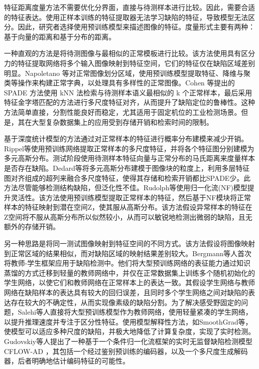 特征距离度量方法不需要优化分界面，直接与待测样本进行比较。因此，需要合适的特征表达。使用正样本训练的特征提取器无法学习缺陷的特征，导致模型无法区分。因此，研究者选择使用预训练模型来描述图像的特征。度量形式主要有两种：基于向量的距离和基于分布的距离。

一种直观的方法是将待测图像与最相似的正常模板进行比较。该方法使用具有区分力的特征提取网络将多个输入图像映射到特征空间，它们的特征仅在缺陷区域差别明显。Napoletano 等\cite{napoletanoAnomalyDetectionNanofibrous2018}对正常图像划分区域，使用预训练模型提取特征、降维与聚类等操作来构建正常字典，以处理具有多样性的正常图像。Cohen 等\cite{cohenSubImageAnomalyDetection2021}提出的 SPADE 方法使用 kNN 法检索与待测样本语义最相似的 k 个正常样本，最后采用特征金字塔匹配的方法进行多尺度特征对齐，从而提升了缺陷定位的鲁棒性。这种方法简单直接，分割性能良好而稳定，尤其适用于固定机位的工业检测场景。但是，其在大型复杂数据集上的应用受到存储开销和检索时间的限制。

基于深度统计模型的方法通过对正常样本的特征进行概率分布建模来减少开销。Rippel等\cite{rippelModelingDistributionNormal2021}使用预训练网络提取正常样本的多尺度特征，并将各个特征图分别建模为多元高斯分布。测试阶段使用待测样本特征向量与正常分布的马氏距离来度量样本是否存在缺陷。Dedard等\cite{defardPaDiMPatchDistribution2021}将多元高斯分布建模于图像块的粒度上，利用多层特征图对齐组成的超列来融合多尺度特征，使得其存储和检索开销都比SPADE\cite{cohenSubImageAnomalyDetection2021}少。此方法尽管能够检测结构缺陷，但泛化性不佳。Rudolph等\cite{rudolphSameSameDifferNet2021}使用归一化流(NF)\cite{rezendeVariationalInferenceNormalizing2016}模型提升灵活性。该方法使用预训练模型提取正常样本的特征，然后基于NF模块将正常样本的特征映射到潜在空间Z，使其服从高斯分布。该方法假设异常样本的特征在Z空间将不服从高斯分布所以似然较小，从而可以敏锐地检测出微弱的缺陷，且无额外的存储开销。

另一种思路是将同一测试图像映射到特征空间的不同方式。该方法假设将图像映射到正常区域的结果相似，而对缺陷区域的映射结果差别较大。Bergmann等人\cite{bergmannUninformedStudentsStudentTeacher2020}首次将教师-学生框架应用于缺陷检测中。他们将大型预训练网络的表征能力通过知识蒸馏的方式迁移到轻量的教师网络中，并仅在正常数据集上训练多个随机初始化的学生网络，以使它们和教师网络在正常样本上的表达一致。其假设学生网络与教师网络在缺陷样本的表达具有较大的回归误差，且同时多个学生网络之间对缺陷的表达存在较大的不确定性，从而实现像素级的缺陷分割。为了解决感受野固定的问题，Salehi等人\cite{salehiMultiresolutionKnowledgeDistillation2021}直接将大型预训练模型作为教师网络，使用轻量紧凑的学生网络，以提升推理速度并专注于区分性特征。使用模型解释性方法，如SmoothGrad\cite{smilkovSmoothGradRemovingNoise2017}等，使模型可以适应多种尺度的缺陷，并极大地降低了计算复杂度，实现了实时检测。Gudovskiy等人\cite{gudovskiyCFLOWADRealTimeUnsupervised2022}提出了一种基于一个条件归一化流框架的实时无监督缺陷检测模型CFLOW-AD ，其包括一个经过鉴别预训练的编码器，以及一个多尺度生成解码器，后者明确地估计编码特征的可能性。


